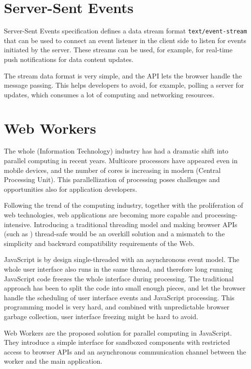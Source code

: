 \section{Server-Sent Events}

Server-Sent Events specification \cite{ServerSentEvents} defines a
data stream format \texttt{text/event-stream} that can be used to
connect an event listener in the client side to listen for events
initiated by the server. These streams can be used, for example, for
real-time push notifications for data content updates.

The stream data format is very simple, and the API lets the browser
handle the message passing. This helps developers to avoid, for
example, polling a server for updates, which consumes a lot of
computing and networking resources.

\section{Web Workers}
\label{section:webworkers}

The whole  (Information Technology) industry has had a
dramatic shift into parallel computing in recent years. Multicore
processors have appeared even in mobile devices, and the number of
cores is increasing in modern  (Central Processing
Unit). This parallellization of processing poses challenges and
opportunities also for application developers. \cite{asanovic2009view}

Following the trend of the computing industry, together with the
proliferation of web technologies, web applications are becoming more
capable and processing-intensive. Introducing a traditional threading
model and making browser APIs (such as ) thread-safe would
be an overkill solution and a mismatch to the simplicity and backward
compatibility requirements of the Web.

JavaScript is by design single-threaded with an asynchronous event
model. The whole user interface also runs in the same thread, and
therefore long running JavaScript code freezes the whole interface
during processing. The traditional approach has been to split the code
into small enough pieces, and let the browser handle the scheduling of
user interface events and JavaScript processing. This programming
model is very hard, and combined with unpredictable browser garbage
collection, user interface freezing might be hard to
avoid. \cite{souders2009even}

Web Workers are the proposed solution for parallel computing in
JavaScript. They introduce a simple interface for sandboxed components
with restricted access to browser APIs and an asynchronous
communication channel between the worker and the main
application. \cite{WebWorkers}

